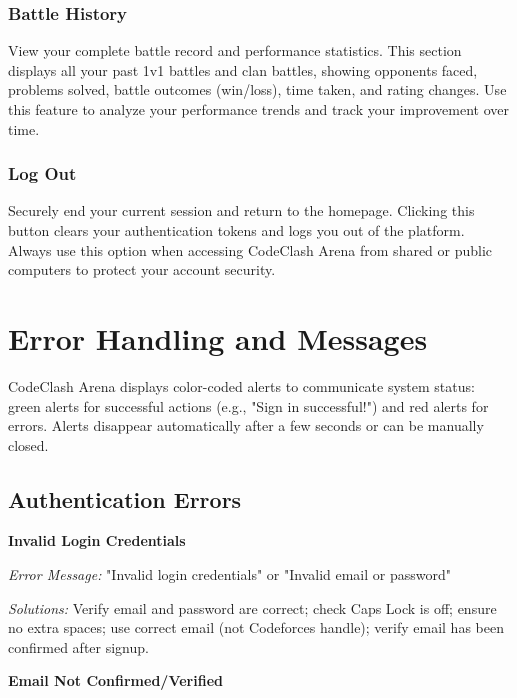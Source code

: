\documentclass[12pt,a4paper]{article}
\begin{document}
\subsubsection{Battle History}

View your complete battle record and performance statistics. This section displays all your past 1v1 battles and clan battles, showing opponents faced, problems solved, battle outcomes (win/loss), time taken, and rating changes. Use this feature to analyze your performance trends and track your improvement over time.

\subsubsection{Log Out}

Securely end your current session and return to the homepage. Clicking this button clears your authentication tokens and logs you out of the platform. Always use this option when accessing CodeClash Arena from shared or public computers to protect your account security.

\FloatBarrier


\section{Error Handling and Messages}

CodeClash Arena displays color-coded alerts to communicate system status: green alerts for successful actions (e.g., "Sign in successful!") and red alerts for errors. Alerts disappear automatically after a few seconds or can be manually closed.

\subsection{Authentication Errors}

\textbf{Invalid Login Credentials}

\textit{Error Message:} "Invalid login credentials" or "Invalid email or password"

\textit{Solutions:} Verify email and password are correct; check Caps Lock is off; ensure no extra spaces; use correct email (not Codeforces handle); verify email has been confirmed after signup.

\textbf{Email Not Confirmed/Verified}
\end{document}
